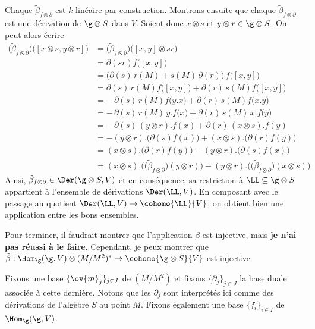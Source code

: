 \begin{annexeConj}
Chaque $\tilde{\beta}_{f \otimes \partial}$ est $k$-linéaire par construction. Montrons ensuite que chaque $\tilde{\beta}_{f \otimes \partial}$ est une dérivation de $\g \otimes S$ dans $V$. Soient donc $x \otimes s$ et $y \otimes r \in \g \otimes S$. On peut alors écrire
\begin{align*}
\Big(\tilde{\beta}_{f \otimes \partial}\Big)\big([x \otimes s, y \otimes r]\big) &= \Big(\tilde{\beta}_{f \otimes \partial}\Big)\big([x,y] \otimes sr\big)\\
&= \partial(sr)f\big([x,y]\big)\\
&= \big(\partial(s) \, r(M) + s(M) \, \partial(r)\big)\,f\big([x,y]\big)\\
&= \partial(s) \, r(M)f\big([x,y]\big) + \partial(r) \, s(M)f\big([x,y]\big)\\
&= - \, \partial(s) \, r(M)f\big(y.x\big) + \partial(r) \, s(M)f\big(x.y\big)\\
&= - \, \partial(s) \, r(M)\,y.f\big(x\big) + \partial(r) \, s(M)\,x.f\big(y\big)\\
&= - \, \partial(s) \, (y \otimes r).f(x) + \partial(r) \, (x \otimes s).f(y)\\
&= - (y \otimes r).\big(\partial(s)f(x)\big) + (x \otimes s).\big(\partial(r)f(y)\big)\\
&= (x \otimes s).\big(\partial(r)f(y)\big) - (y \otimes r).\big(\partial(s)f(x)\big)\\
&= (x \otimes s).\Big(\big(\tilde{\beta}_{f \otimes \partial}\big)(y \otimes r)\Big) - (y \otimes r).\Big(\big(\tilde{\beta}_{f \otimes \partial}\big)(x \otimes s)\Big)
\end{align*}
Ainsi, $\tilde{\beta}_{f \otimes \partial} \in \Der(\g \otimes S,V)$ et en conséquence, sa restriction à $\LL \subseteq \g \otimes S$ appartient à l'ensemble de dérivations $\Der(\LL,V)$. En composant avec le passage au quotient $\Der(\LL,V) \rightarrow \cohomo{\LL}{V}$, on obtient bien une application entre les bons ensembles.

Pour terminer, il faudrait montrer que l'application $\beta$ est injective, mais \textbf{je n'ai pas réussi à le faire}. Cependant, je peux montrer que $\tilde{\beta} : \Hom_\g(\g,V) \otimes (M/M^2)^* \rightarrow \cohomo{\g \otimes S}{V}$ est injective. 

Fixons une base $\{\ov{m}_j\}_{j \in J}$ de $(M/M^2)$ et fixons $\{\partial_j\}_{j \in J}$ la base duale associée  à cette dernière. Notons que les $\partial_j$ sont interprétés ici comme des dérivations de l'algèbre $S$ au point $M$. Fixons également une base $\{f_i\}_{i \in I}$ de $\Hom_\g(\g,V)$.


\end{annexeConj}
